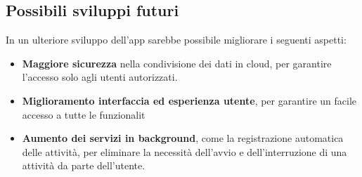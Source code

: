 \documentclass{article}
\begin{document}
    \subsection*{Possibili sviluppi futuri}
    In un ulteriore sviluppo dell'app sarebbe possibile migliorare i seguenti aspetti:
    \begin{itemize}
        \renewcommand{\labelitemi}{-}
        \item \textbf{Maggiore sicurezza} nella condivisione dei dati in cloud, per garantire l'accesso solo agli utenti autorizzati.
        \item \textbf{Miglioramento interfaccia ed esperienza utente}, per garantire un facile accesso a tutte le funzionalit
        \item \textbf{Aumento dei servizi in background}, come la registrazione automatica delle attività, per eliminare la necessità dell'avvio e dell'interruzione di una attività da parte dell'utente.
    \end{itemize}
\end{document}

